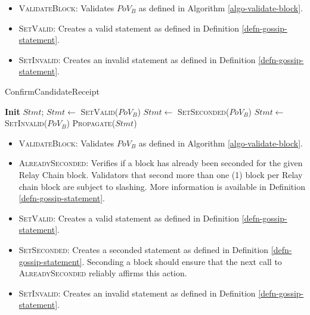 \begin{itemize}
  \item \textsc{ValidateBlock}: Validates $PoV_B$ as defined in Algorithm
  \ref{algo-validate-block}.
  \item \textsc{SetValid}: Creates a valid statement as defined in Definition
  \ref{defn-gossip-statement}.
  \item \textsc{SetInvalid}: Creates an invalid statement as defined in
  Definition \ref{defn-gossip-statement}.
\end{itemize}

\begin{algorithm}[H]
  \caption[]{\sc ConfirmCandidateReceipt}
  \label{algo-endorse-candidate-receipt}
  \begin{algorithmic}[1]
      \State \textbf{Init} $Stmt$;
          \State $Stmt \leftarrow$ \textsc{SetValid($PoV_B$)}
        \Else
          \State $Stmt \leftarrow$ \textsc{SetSeconded($PoV_B$)}
        \EndIf
      \Else
        \State $Stmt \leftarrow$ \textsc{SetInvalid($PoV_B$)}
      \EndIf
      \State \textsc{Propagate}($Stmt$)
  \end{algorithmic}
\end{algorithm}

\begin{itemize}
  \item \textsc{ValidateBlock}: Validates $PoV_B$ as defined in Algorithm
  \ref{algo-validate-block}.
  \item \textsc{AlreadySeconded}: Verifies if a block has already been seconded
  for the given Relay Chain block. Validators that second more than one (1)
  block per Relay chain block are subject to slashing. More information is
  available in Definition \ref{defn-gossip-statement}.
  \item \textsc{SetValid}: Creates a valid statement as defined in Definition
  \ref{defn-gossip-statement}.
  \item \textsc{SetSeconded}: Creates a seconded statement as defined in
  Definition \ref{defn-gossip-statement}. Seconding a block should ensure that
  the next call to \textsc{AlreadySeconded} reliably affirms this action.
  \item \textsc{SetInvalid}: Creates an invalid statement as defined in
  Definition \ref{defn-gossip-statement}.
\end{itemize}

